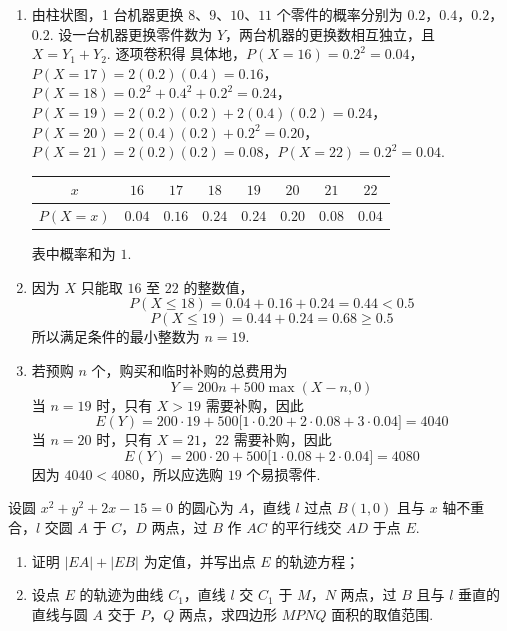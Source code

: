 \begin{solution}
\begin{enumerate}
\item 由柱状图，1 台机器更换 \(8\)、\(9\)、\(10\)、\(11\) 个零件的概率分别为
\(0.2\)，\(0.4\)，\(0.2\)，\(0.2\).
设一台机器更换零件数为 \(Y\)，两台机器的更换数相互独立，且 \(X=Y_1+Y_2\). 逐项卷积得
具体地，\(P(X=16)=0.2^2=0.04\)，\(P(X=17)=2(0.2)(0.4)=0.16\)，\(P(X=18)=0.2^2+0.4^2+0.2^2=0.24\)，\(P(X=19)=2(0.2)(0.2)+2(0.4)(0.2)=0.24\)，\(P(X=20)=2(0.4)(0.2)+0.2^2=0.20\)，\(P(X=21)=2(0.2)(0.2)=0.08\)，\(P(X=22)=0.2^2=0.04\).
\begin{center}
\begin{tabular}{c|ccccccc}
\(x\) & \(16\) & \(17\) & \(18\) & \(19\) & \(20\) & \(21\) & \(22\)\\ \hline
\(P(X=x)\) & \(0.04\) & \(0.16\) & \(0.24\) & \(0.24\) & \(0.20\) & \(0.08\) & \(0.04\)
\end{tabular}
\end{center}
表中概率和为 \(1\).
\item 因为 \(X\) 只能取 \(16\) 至 \(22\) 的整数值，
\[
P(X\leqslant18)=0.04+0.16+0.24=0.44<0.5
\]
\[
P(X\leqslant19)=0.44+0.24=0.68\geqslant0.5
\]
所以满足条件的最小整数为 \(n=19\).
\item 若预购 \(n\) 个，购买和临时补购的总费用为
\[
Y=200n+500\max(X-n,0)
\]
当 \(n=19\) 时，只有 \(X>19\) 需要补购，因此
\[
E(Y)=200\cdot19+500\bigl[1\cdot0.20+2\cdot0.08+3\cdot0.04\bigr]=4040
\]
当 \(n=20\) 时，只有 \(X=21\)，\(22\) 需要补购，因此
\[
E(Y)=200\cdot20+500\bigl[1\cdot0.08+2\cdot0.04\bigr]=4080
\]
因为 \(4040<4080\)，所以应选购 \(19\) 个易损零件.
\end{enumerate}
\end{solution}


\begin{problem}
设圆 \(x^2+y^2+2x-15=0\) 的圆心为 \(A\)，直线 \(l\) 过点 \(B(1,0)\) 且与 \(x\) 轴不重合，\(l\) 交圆 \(A\) 于 \(C\)，\(D\) 两点，过 \(B\) 作 \(AC\) 的平行线交 \(AD\) 于点 \(E\).

\begin{enumerate}
\item 证明 \(|EA|+|EB|\) 为定值，并写出点 \(E\) 的轨迹方程；
\item 设点 \(E\) 的轨迹为曲线 \(C_1\)，直线 \(l\) 交 \(C_1\) 于 \(M\)，\(N\) 两点，过 \(B\) 且与 \(l\) 垂直的直线与圆 \(A\) 交于 \(P\)，\(Q\) 两点，求四边形 \(MPNQ\) 面积的取值范围.
\end{enumerate}
\end{problem}

